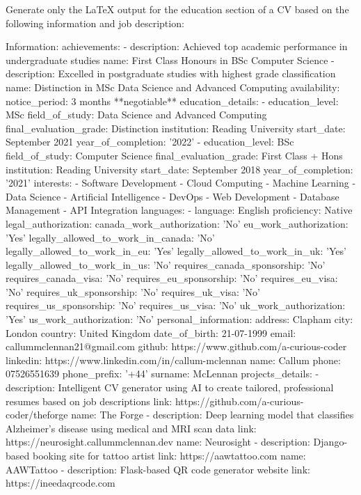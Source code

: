 \documentclass{resume}
\begin{document}
    Generate only the LaTeX output for the education section of a CV based on the following information and job description:

    Information:
    achievements:
- description: Achieved top academic performance in undergraduate studies
  name: First Class Honours in BSc Computer Science
- description: Excelled in postgraduate studies with highest grade classification
  name: Distinction in MSc Data Science and Advanced Computing
availability:
  notice_period: 3 months **negotiable**
education_details:
- education_level: MSc
  field_of_study: Data Science and Advanced Computing
  final_evaluation_grade: Distinction
  institution: Reading University
  start_date: September 2021
  year_of_completion: '2022'
- education_level: BSc
  field_of_study: Computer Science
  final_evaluation_grade: First Class + Hons
  institution: Reading University
  start_date: September 2018
  year_of_completion: '2021'
interests:
- Software Development
- Cloud Computing
- Machine Learning
- Data Science
- Artificial Intelligence
- DevOps
- Web Development
- Database Management
- API Integration
languages:
- language: English
  proficiency: Native
legal_authorization:
  canada_work_authorization: 'No'
  eu_work_authorization: 'Yes'
  legally_allowed_to_work_in_canada: 'No'
  legally_allowed_to_work_in_eu: 'Yes'
  legally_allowed_to_work_in_uk: 'Yes'
  legally_allowed_to_work_in_us: 'No'
  requires_canada_sponsorship: 'No'
  requires_canada_visa: 'No'
  requires_eu_sponsorship: 'No'
  requires_eu_visa: 'No'
  requires_uk_sponsorship: 'No'
  requires_uk_visa: 'No'
  requires_us_sponsorship: 'No'
  requires_us_visa: 'No'
  uk_work_authorization: 'Yes'
  us_work_authorization: 'No'
personal_information:
  address: Clapham
  city: London
  country: United Kingdom
  date_of_birth: 21-07-1999
  email: callummclennan21@gmail.com
  github: https://www.github.com/a-curious-coder
  linkedin: https://www.linkedin.com/in/callum-mclennan
  name: Callum
  phone: 07526551639
  phone_prefix: '+44'
  surname: McLennan
projects_details:
- description: Intelligent CV generator using AI to create tailored, professional
    resumes based on job descriptions
  link: https://github.com/a-curious-coder/theforge
  name: The Forge
- description: Deep learning model that classifies Alzheimer's disease using medical
    and MRI scan data
  link: https://neurosight.callummclennan.dev
  name: Neurosight
- description: Django-based booking site for tattoo artist
  link: https://aawtattoo.com
  name: AAWTattoo
- description: Flask-based QR code generator website
  link: https://ineedaqrcode.com
\end{document}
